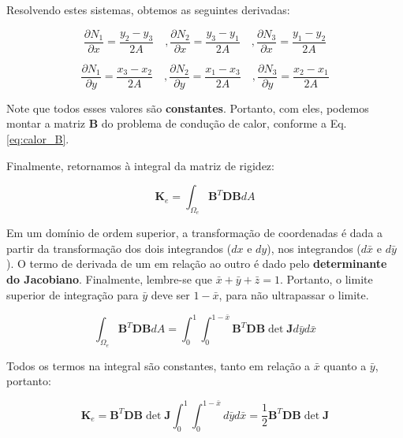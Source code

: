        Resolvendo estes sistemas, obtemos as seguintes derivadas:

        \begin{equation*}
            \frac{\partial N_1}{\partial x} = \frac{y_2-y_3}{2A} \quad,
            \frac{\partial N_2}{\partial x} = \frac{y_3-y_1}{2A} \quad,
            \frac{\partial N_3}{\partial x} = \frac{y_1-y_2}{2A}
        \end{equation*}

        \begin{equation}
            \frac{\partial N_1}{\partial y} = \frac{x_3-x_2}{2A} \quad,
            \frac{\partial N_2}{\partial y} = \frac{x_1-x_3}{2A} \quad,
            \frac{\partial N_3}{\partial y} = \frac{x_2-x_1}{2A}
        \end{equation}

        Note que todos esses valores são \textbf{constantes}. Portanto, com eles, podemos montar a matriz $\mathbf{B}$ do problema de condução de calor, conforme a Eq. \eqref{eq:calor_B}.

        Finalmente, retornamos à integral da matriz de rigidez:

        \begin{equation*}
            \mathbf{K}_e = \int_{\Omega_e} \mathbf{B}^T \mathbf{D} \mathbf{B} dA
        \end{equation*}

        Em um domínio de ordem superior, a transformação de coordenadas é dada a partir da transformação dos dois integrandos ($dx$ e $dy$), nos integrandos ($d\bar{x}$ e $d\bar{y}$). O termo de derivada de um em relação ao outro é dado pelo \textbf{determinante do Jacobiano}. Finalmente, lembre-se que $\bar{x} + \bar{y} + \bar{z} = 1$. Portanto, o limite superior de integração para $\bar{y}$ deve ser $1-\bar{x}$, para não ultrapassar o limite.

        \begin{equation*}
            \int_{\Omega_e} \mathbf{B}^T \mathbf{D} \mathbf{B} dA = \int_{0}^{1} \int_{0}^{1-\bar{x}} \mathbf{B}^T \mathbf{D} \mathbf{B} \det \mathbf{J} d\bar{y} d\bar{x}
        \end{equation*}

        Todos os termos na integral são constantes, tanto em relação a $\bar{x}$ quanto a $\bar{y}$, portanto:


        \begin{equation}
            \mathbf{K}_e = \mathbf{B}^T \mathbf{D} \mathbf{B} \det \mathbf{J} \int_{0}^{1} \int_{0}^{1-\bar{x}}  d\bar{y} d\bar{x} = \frac{1}{2} \mathbf{B}^T \mathbf{D} \mathbf{B} \det \mathbf{J}
        \end{equation}


